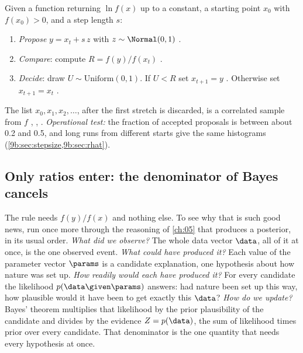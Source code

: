 \begin{workdef}
Given a function returning $\ln f(x)$ up to a constant, a starting point $x_0$ with $f(x_0)>0$,
and a step length $s$:
\begin{enumerate}[nosep]
  \item \emph{Propose} $y=x_t+s\,z$ with $z\sim\Normal(0,1)$ .
  \item \emph{Compare}: compute $R=f(y)/f(x_t)$ .
  \item \emph{Decide}: draw $U\sim\mathrm{Uniform}(0,1)$. If $U<R$ set $x_{t+1}=y$
        . Otherwise set $x_{t+1}=x_t$
        .
\end{enumerate}
The list $x_0,x_1,x_2,\dots$, after the first stretch is discarded, is a correlated sample from
$f$ , , .
\emph{Operational test:} the fraction of accepted proposals is between about 0.2 and 0.5, and
long runs from different starts give the same histograms (\cref{9b:sec:stepsize,9b:sec:rhat}).
\end{workdef}

\subsection{Only ratios enter: the denominator of Bayes cancels}
\label{9b:sec:ratios}

The rule needs $f(y)/f(x)$ and nothing else. To see why that is such good news, run once more
through the reasoning of \cref{ch:05} that produces a posterior, in its usual order. \emph{What
did we observe?} The whole data vector $\data$, all of it at once, is the one observed event.
\emph{What could have produced it?} Each value of the parameter vector $\params$ is a candidate
explanation, one hypothesis about how nature was set up. \emph{How readily would each have
produced it?} For every candidate the likelihood $p(\data\given\params)$ answers: had nature
been set up this way, how plausible would it have been to get exactly this $\data$?
\emph{How do we update?} Bayes' theorem multiplies that likelihood by the prior plausibility of
the candidate and divides by the evidence $Z=p(\data)$, the sum of likelihood times prior over
every candidate. That denominator is the one quantity that needs every hypothesis at once.

